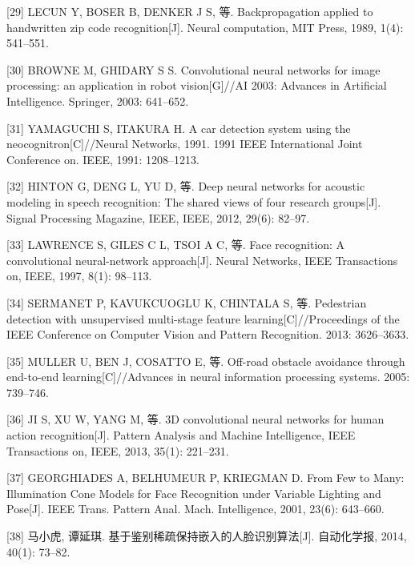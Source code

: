 \documentclass[bachelor,zhspacing]{cqu}  %
\begin{document}
\hypertarget{ref-lecun1989backpropagation}{}
{[}29{]} LECUN Y, BOSER B, DENKER J S, 等. Backpropagation applied to
handwritten zip code recognition{[}J{]}. Neural computation, MIT Press,
1989, 1(4): 541--551.

\hypertarget{ref-browne2003convolutional}{}
{[}30{]} BROWNE M, GHIDARY S S. Convolutional neural networks for image
processing: an application in robot vision{[}G{]}//AI 2003: Advances in
Artificial Intelligence. Springer, 2003: 641--652.

\hypertarget{ref-yamaguchi1991car}{}
{[}31{]} YAMAGUCHI S, ITAKURA H. A car detection system using the
neocognitron{[}C{]}//Neural Networks, 1991. 1991 IEEE International
Joint Conference on. IEEE, 1991: 1208--1213.

\hypertarget{ref-hinton2012deep}{}
{[}32{]} HINTON G, DENG L, YU D, 等. Deep neural networks for acoustic
modeling in speech recognition: The shared views of four research
groups{[}J{]}. Signal Processing Magazine, IEEE, IEEE, 2012, 29(6):
82--97.

\hypertarget{ref-lawrence1997face}{}
{[}33{]} LAWRENCE S, GILES C L, TSOI A C, 等. Face recognition: A
convolutional neural-network approach{[}J{]}. Neural Networks, IEEE
Transactions on, IEEE, 1997, 8(1): 98--113.

\hypertarget{ref-sermanet2013pedestrian}{}
{[}34{]} SERMANET P, KAVUKCUOGLU K, CHINTALA S, 等. Pedestrian detection
with unsupervised multi-stage feature learning{[}C{]}//Proceedings of
the IEEE Conference on Computer Vision and Pattern Recognition. 2013:
3626--3633.

\hypertarget{ref-muller2005off}{}
{[}35{]} MULLER U, BEN J, COSATTO E, 等. Off-road obstacle avoidance
through end-to-end learning{[}C{]}//Advances in neural information
processing systems. 2005: 739--746.

\hypertarget{ref-ji20133d}{}
{[}36{]} JI S, XU W, YANG M, 等. 3D convolutional neural networks for
human action recognition{[}J{]}. Pattern Analysis and Machine
Intelligence, IEEE Transactions on, IEEE, 2013, 35(1): 221--231.

\hypertarget{ref-GeBeKr01}{}
{[}37{]} GEORGHIADES A, BELHUMEUR P, KRIEGMAN D. From Few to Many:
Illumination Cone Models for Face Recognition under Variable Lighting
and Pose{[}J{]}. IEEE Trans. Pattern Anal. Mach. Intelligence, 2001,
23(6): 643--660.

\hypertarget{ref-ux9a6cux5c0fux864e2014ux57faux4e8eux9274ux522bux7a00ux758fux4fddux6301ux5d4cux5165ux7684ux4ebaux8138ux8bc6ux522bux7b97ux6cd5}{}
{[}38{]} 马小虎, 谭延琪. 基于鉴别稀疏保持嵌入的人脸识别算法{[}J{]}.
自动化学报, 2014, 40(1): 73--82.
\end{document}

